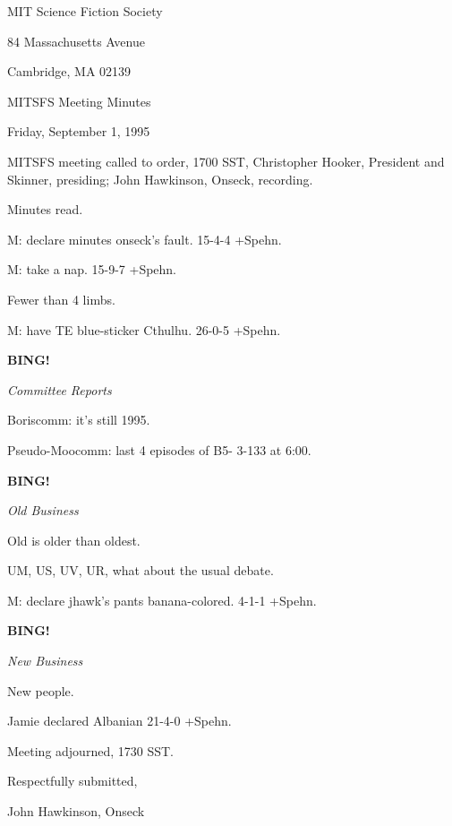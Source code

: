 \documentclass[12pt]{article}
\newcommand{\bing}{{\bf BING!} }
\newcommand{\goto}[1]{\bing \vskip 12pt \centerline{{\em{#1}}}}
\begin{document}
\begin{center}

MIT Science Fiction Society 

84 Massachusetts Avenue

Cambridge, MA 02139

\vspace{12pt}

MITSFS Meeting Minutes 

Friday, September 1, 1995

\end{center}
 
\vspace{18pt}

\setlength{\parskip}{6pt}

\noindent
MITSFS meeting called to order, 1700 SST,
Christopher Hooker, President and Skinner, presiding; John Hawkinson, Onseck, recording.

Minutes read.

M: declare minutes onseck's fault. 15-4-4 +Spehn.

M: take a nap. 15-9-7 +Spehn.

Fewer than 4 limbs.

M: have TE blue-sticker Cthulhu. 26-0-5 +Spehn.

\goto{Committee Reports}

Boriscomm: it's still 1995.

Pseudo-Moocomm: last 4 episodes of B5- 3-133 at 6:00.

\goto{Old Business}

Old is older than oldest.

UM, US, UV, UR, what about the usual debate.

M: declare jhawk's pants banana-colored. 4-1-1 +Spehn.

\goto{New Business}

New people.

Jamie declared Albanian 21-4-0 +Spehn.

\vspace{12pt}

\noindent
Meeting adjourned, 1730 SST.

\vspace{18pt}

\centerline{Respectfully submitted,}
\centerline{John Hawkinson, Onseck}
\end{document}
